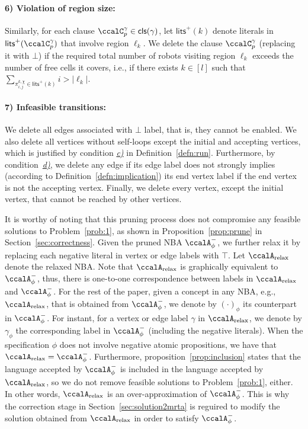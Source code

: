 \documentclass[Afour,sageh,times]{sagej}
\newcommand{\clause}[1]{\mathsf{cls}(#1)}
\newcommand{\cp}[2]{\ccalC_{#1}^{#2}}
\newcommand{\auto}[1]{\ccalA_{\textup{#1}}}
\newcommand{\autop}{\ccalA_{\phi}}
\renewcommand{\ap}[3]{\mathcal{\pi}_{{#1},{#2}}^{#3}}
\begin{document}
{       \paragraph{6) Violation of region size:} \label{prune:violation2} Similarly, for each clause $\cp{p}{\gamma} \in \clause{\gamma}$, let $\mathsf{lits}^+(k)$ denote literals in $\mathsf{lits}^+(\cp{p}{\gamma})$ that involve region $\ell_{k}$. We delete the clause $\cp{p}{\gamma}$ (replacing it with $\bot$) if the required total number of robots  visiting region $\ell_{k}$ exceeds the number of free cells it covers, i.e., if there exists $k\in[l]$ such that $ \sum_{\ap{i}{j}{k,\chi}\in\mathsf{lits}^+(k)}   i > |\ell_k|$.
       \paragraph{7) Infeasible transitions:} \label{prune:infeasible} We delete all edges associated with $\bot$ label, that is, they cannot be enabled.  We also delete all vertices without self-loops except the initial and accepting vertices, which is justified by condition \hyperref[cond:c]{\it c)} in Definition~\ref{defn:run}. Furthermore, by condition~\hyperref[cond:d]{\it d)}, we delete any edge if its edge label does not strongly implies (according to Definition~\ref{defn:implication}) its end vertex label if the end vertex is not the accepting vertex. Finally, we delete every vertex, except the initial vertex, that cannot be reached by other vertices.

       It is worthy of noting that  this pruning process does not compromise any feasible solutions  to Problem~\ref{prob:1}, as shown in Proposition~\ref{prop:prune} in Section~\ref{sec:correctness}. Given the pruned NBA $\autop^-$, we further relax it by replacing each negative literal in vertex or edge labels with $\top$. Let $\auto{relax}$ denote the relaxed NBA. Note that $\auto{relax}$ is graphically equivalent to $\autop^-$, thus, there is one-to-one correspondence between labels in $\auto{relax}$ and $\autop^-$. For the rest of the paper, given a concept in any NBA, e.g., $\auto{relax}$,  that is obtained from $\autop^-$, we denote by $(\cdot)_\phi$ its counterpart in $\autop^-$. For instant, for a vertex or edge label $\gamma$ in $\auto{relax}$, we denote by $\gamma_\phi$ the corresponding label in $\autop^-$ (including the negative literals). When the specification $\phi$ does not involve negative atomic propositions, we have that $\auto{relax} = \autop^-$.       Furthermore, proposition~\ref{prop:inclusion} states that the language accepted by $\autop^-$ is included in the language accepted by $\auto{relax}$, so we do not remove feasible solutions to Problem~\ref{prob:1}, either. In other words, $\auto{relax}$ is an over-approximation of $\autop^-$. This is why the correction stage in Section~\ref{sec:solution2mrta} is reguired to modify the solution obtained from $\auto{relax}$ in order to satisfy $\autop^-$.

}
\end{document}
